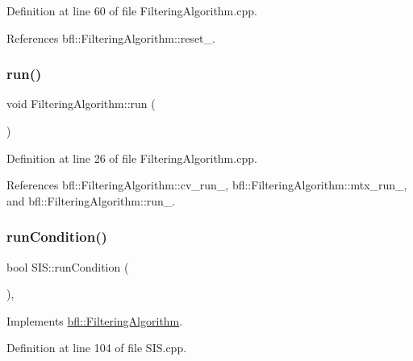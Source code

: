 Definition at line 60 of file Filtering\+Algorithm.\+cpp.



References bfl\+::\+Filtering\+Algorithm\+::reset\+\_\+.

\mbox{\label{classbfl_1_1FilteringAlgorithm_a009cbe5f4bbb16967f6c6ddcaed8fbb1}} 
\subsubsection{\texorpdfstring{run()}{run()}}
{\footnotesize\ttfamily void Filtering\+Algorithm\+::run (\begin{DoxyParamCaption}{ }\end{DoxyParamCaption})\hspace{0.3cm}{\ttfamily [inherited]}}



Definition at line 26 of file Filtering\+Algorithm.\+cpp.



References bfl\+::\+Filtering\+Algorithm\+::cv\+\_\+run\+\_\+, bfl\+::\+Filtering\+Algorithm\+::mtx\+\_\+run\+\_\+, and bfl\+::\+Filtering\+Algorithm\+::run\+\_\+.

\mbox{\label{classbfl_1_1SIS_a669ac8eb19f6797f2735b94074727e8f}} 
\subsubsection{\texorpdfstring{run\+Condition()}{runCondition()}}
{\footnotesize\ttfamily bool S\+I\+S\+::run\+Condition (\begin{DoxyParamCaption}{ }\end{DoxyParamCaption})\hspace{0.3cm}{\ttfamily [override]}, {\ttfamily [virtual]}}



Implements \mbox{\hyperlink{classbfl_1_1FilteringAlgorithm_a5fc12882356f6906b102fbfff2bc4b7c}{bfl\+::\+Filtering\+Algorithm}}.



Definition at line 104 of file S\+I\+S.\+cpp.

\mbox{\label{classbfl_1_1ParticleFilter_a2d7a5e7aaad179037273d35be229056d}} 

